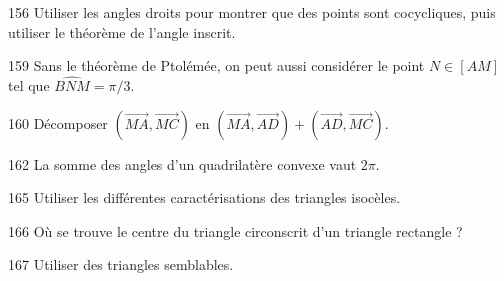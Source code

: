 \begin{Hint}{156}
Utiliser les angles droits pour montrer que des points sont cocycliques, puis utiliser le théorème de l'angle inscrit.
\end{Hint}
\begin{Hint}{159}
Sans le théorème de Ptolémée, on peut aussi considérer le point $N \in [AM]$ tel que $\widehat{BNM}=\pi/3$.
\end{Hint}
\begin{Hint}{160}
Décomposer $(\overrightarrow{MA},\overrightarrow{MC})$ en $(\overrightarrow{MA},\overrightarrow{AD}) + (\overrightarrow{AD},\overrightarrow{MC})$.%
\end{Hint}
\begin{Hint}{162}
La somme des angles d'un quadrilatère convexe vaut $2\pi$.
\end{Hint}
\begin{Hint}{165}
Utiliser les différentes caractérisations des triangles isocèles.
\end{Hint}
\begin{Hint}{166}
Où se trouve le centre du triangle circonscrit d'un triangle rectangle ?
\end{Hint}
\begin{Hint}{167}
Utiliser des triangles semblables.
\end{Hint}
